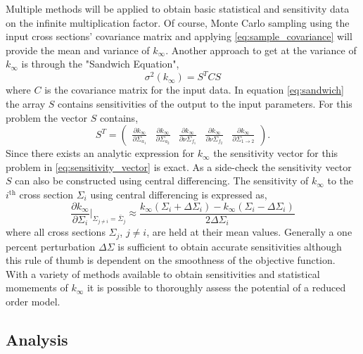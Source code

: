 Multiple methods will be applied to obtain basic statistical and sensitivity data on the infinite multiplication factor. Of course, Monte Carlo sampling using the input cross sections' covariance matrix and applying \ref{eq:sample_covariance} will provide the mean and variance of $k_{\infty}$. Another approach to get at the variance of $k_{\infty}$ is through the "Sandwich Equation"\cite{Jessee_Turinsky},
\begin{equation}
\label{eq:sandwich}
   \sigma^2(k_{\infty}) = S^TCS
\end{equation}      
where $C$ is the covariance matrix for the input data. In equation \ref{eq:sandwich} the array $S$ contains sensitivities of the output to the input parameters. For this problem the vector $S$ contains,
\begin{equation}
\label{eq:sensitivity_vector}
   S^T = \left(
    \begin{array}{ccccc}
     \frac{\partial k_{\infty}}{\partial\Sigma_{a_1}} &
     \frac{\partial k_{\infty}}{\partial\Sigma_{a_2}} &
     \frac{\partial k_{\infty}}{\partial\nu\Sigma_{f_1}} &
     \frac{\partial k_{\infty}}{\partial\nu\Sigma_{f_2}} &
     \frac{\partial k_{\infty}}{\partial\Sigma_{1\rightarrow 2}}
    \end{array}
         \right).
\end{equation} 
Since there exists an analytic expression for $k_{\infty}$ the sensitivity vector for this problem in \ref{eq:sensitivity_vector} is exact. As a side-check the sensitivity vector $S$ can also be constructed using central differencing. The sensitivity of $k_{\infty}$ to the $i^{\text{th}}$ cross section $\Sigma_i$ using central differencing is expressed as, 
\begin{equation}
\label{eq:central_diff_kinf}
   \frac{\partial k_{\infty}}{\partial \Sigma_i}\biggr\rvert_
   {\Sigma_{j\neq i} = \bar{\Sigma}_j}
    \approx \frac{k_{\infty}(\Sigma_i + \Delta\Sigma_i) - 
    k_{\infty}(\Sigma_i - \Delta\Sigma_i)}
    {2\Delta\Sigma_i}
\end{equation} 
where all cross sections $\Sigma_j$, $j\neq i$, are held at their mean values. Generally a one percent perturbation $\Delta\Sigma$ is sufficient to obtain accurate sensitivities although this rule of thumb is dependent on the smoothness of the objective function. With a variety of methods available to obtain sensitivities and statistical momements of $k_{\infty}$ it is possible to thoroughly assess the potential of a reduced order model.       
     
\subsection{Analysis}
\label{subsec:kinf_analysis}

